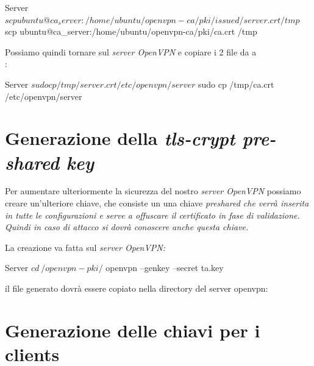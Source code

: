 \begin{bashcode}{Server}{}
$ scp ubuntu@ca_server:/home/ubuntu/openvpn-ca/pki/issued/server.crt /tmp
$ scp ubuntu@ca_server:/home/ubuntu/openvpn-ca/pki/ca.crt /tmp
\end{bashcode}

Possiamo quindi tornare sul \textit{server OpenVPN} e copiare i 2 file da  a \\:

\begin{bashcode}{Server}{}
$ sudo cp /tmp/server.crt /etc/openvpn/server
$ sudo cp /tmp/ca.crt /etc/openvpn/server
\end{bashcode}


\section{Generazione della \textit{tls-crypt pre-shared key}}
\label{sec:tls-crypt}

Per aumentare ulteriormente la sicurezza del nostro \textit{server OpenVPN} possiamo creare un'ulteriore chiave, che consiste un una chiave \it{preshared} che verrà inserita in tutte le configurazioni e serve a offuscare il certificato in fase di validazione. Quindi in caso di attacco si dovrà conoscere anche questa chiave.

La creazione va fatta sul \it{server OpenVPN}:

\begin{bashcode}{Server}{}
$ cd ~/openvpn-pki/
$ openvpn --genkey --secret ta.key
\end{bashcode}

il file generato  dovrà essere copiato nella directory del server openvpn:



\section{Generazione delle chiavi per i clients}
\label{sec:client_keys}

